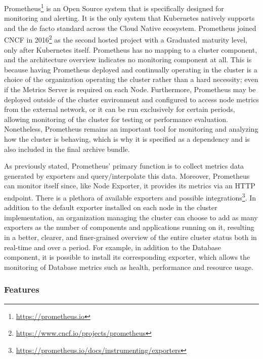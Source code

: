 Prometheus\footnote{\url{https://prometheus.io}} is an Open Source system that is
specifically designed for monitoring and alerting. It is the only system that
Kubernetes natively supports and the de facto standard across the Cloud Native
ecosystem. Prometheus joined CNCF in 2016\footnote{\url{https://www.cncf.io/projects/prometheus}}
as the second hosted project with a Graduated maturity level, only after
Kubernetes itself. Prometheus has no mapping to a cluster component, and the
architecture overview indicates no monitoring component at all. This is because having
Prometheus deployed and continually operating in the cluster is a choice of the organization
operating the cluster rather than a hard necessity; even if the Metrics Server
is required on each Node. Furthermore, Prometheus may be deployed outside of the
cluster environment and configured to access node metrics from the external
network, or it can be run exclusively for certain periods, allowing monitoring
of the cluster for testing or performance evaluation. Nonetheless, Prometheus
remains an important tool for monitoring and analyzing how the cluster is
behaving, which is why it is specified as a dependency and is also included in the
final archive bundle.

As previously stated, Prometheus' primary function is to collect metrics data generated
by exporters and query/interpolate this data. Moreover, Prometheus can monitor itself
since, like Node Exporter, it provides its metrics via an HTTP endpoint. There
is a plethora of available exporters and possible integrations\footnote{\url{https://prometheus.io/docs/instrumenting/exporters}}.
In addition to the default exporter installed on each node in the cluster implementation,
an organization managing the cluster can choose to add as many exporters as the
number of components and applications running on it, resulting in a better,
clearer, and finer-grained overview of the entire cluster status both in real-time
and over a period. For example, in addition to the Database component, it is
possible to install its corresponding exporter, which allows the monitoring of Database
metrics such as health, performance and resource usage.

\subsubsection{Features}
\label{subsubsec:implementation_dependencies_prometheus_features}

